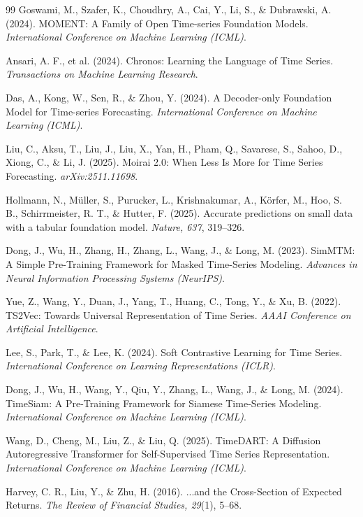 \begin{thebibliography}{99}
Goswami, M., Szafer, K., Choudhry, A., Cai, Y., Li, S., \& Dubrawski, A. (2024).
MOMENT: A Family of Open Time-series Foundation Models. \textit{International
Conference on Machine Learning (ICML)}.

Ansari, A. F., et al. (2024). Chronos: Learning the Language of Time Series.
\textit{Transactions on Machine Learning Research}.

Das, A., Kong, W., Sen, R., \& Zhou, Y. (2024). A Decoder-only Foundation Model for
Time-series Forecasting. \textit{International Conference on Machine Learning (ICML)}.

Liu, C., Aksu, T., Liu, J., Liu, X., Yan, H., Pham, Q., Savarese, S., Sahoo, D.,
Xiong, C., \& Li, J. (2025). Moirai 2.0: When Less Is More for Time Series
Forecasting. \textit{arXiv:2511.11698}.

Hollmann, N., Müller, S., Purucker, L., Krishnakumar, A., Körfer, M., Hoo, S. B.,
Schirrmeister, R. T., \& Hutter, F. (2025). Accurate predictions on small data with
a tabular foundation model. \textit{Nature, 637}, 319--326.

Dong, J., Wu, H., Zhang, H., Zhang, L., Wang, J., \& Long, M. (2023). SimMTM:
A Simple Pre-Training Framework for Masked Time-Series Modeling. \textit{Advances in
Neural Information Processing Systems (NeurIPS)}.

Yue, Z., Wang, Y., Duan, J., Yang, T., Huang, C., Tong, Y., \& Xu, B. (2022). TS2Vec:
Towards Universal Representation of Time Series. \textit{AAAI Conference on
Artificial Intelligence}.

Lee, S., Park, T., \& Lee, K. (2024). Soft Contrastive Learning for Time Series.
\textit{International Conference on Learning Representations (ICLR)}.

Dong, J., Wu, H., Wang, Y., Qiu, Y., Zhang, L., Wang, J., \& Long, M. (2024).
TimeSiam: A Pre-Training Framework for Siamese Time-Series Modeling.
\textit{International Conference on Machine Learning (ICML)}.

Wang, D., Cheng, M., Liu, Z., \& Liu, Q. (2025). TimeDART: A Diffusion Autoregressive
Transformer for Self-Supervised Time Series Representation. \textit{International
Conference on Machine Learning (ICML)}.

Harvey, C. R., Liu, Y., \& Zhu, H. (2016). ...and the Cross-Section of Expected
Returns. \textit{The Review of Financial Studies, 29}(1), 5--68.


\end{thebibliography}
